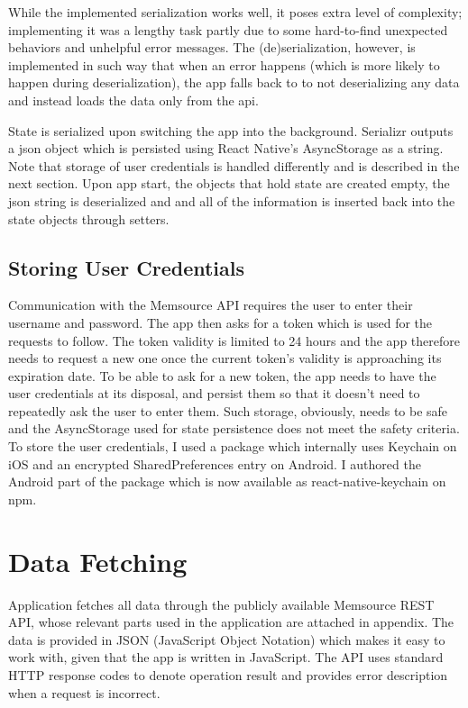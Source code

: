 While the implemented serialization works well, it poses extra level of complexity; implementing it was a lengthy task partly due to some hard-to-find unexpected behaviors and unhelpful error messages. The (de)serialization, however, is implemented in such way that when an error happens (which is more likely to happen during deserialization), the app falls back to to not deserializing any data and instead loads the data only from the api.


State is serialized upon switching the app into the background. Serializr outputs a json object which is persisted using React Native’s AsyncStorage as a string. Note that storage of user credentials is handled differently and is described in the next section. Upon app start, the objects that hold state are created empty, the json string is deserialized and and all of the information is inserted back into the state objects through setters. 


\subsection{Storing User Credentials}

Communication with the Memsource API requires the user to enter their username and password. The app then asks for a token which is used for the requests to follow. The token validity is limited to 24 hours and the app therefore needs to request a new one once the current token's validity is approaching its expiration date. To be able to ask for a new token, the app needs to have the user credentials at its disposal, and persist them so that it doesn't need to repeatedly ask the user to enter them. Such storage, obviously, needs to be safe and the AsyncStorage used for state persistence does not meet the safety criteria. To store the user credentials, I used a package which internally uses Keychain on iOS and an encrypted SharedPreferences entry on Android. I authored the Android part of the package which is now available as react-native-keychain on npm. 

\section{Data Fetching}

Application fetches all data through the publicly available Memsource REST API, whose relevant parts used in the application are attached in appendix. The data is provided in JSON (JavaScript Object Notation) which makes it easy to work with, given that the app is written in JavaScript. The API uses standard HTTP response codes to denote operation result and provides error description when a request is incorrect.

